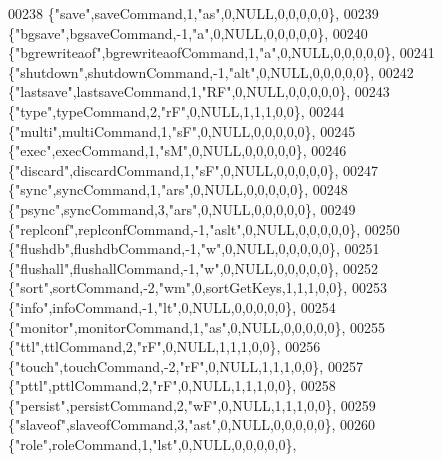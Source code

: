\begin{DoxyCode}
00238     \{\textcolor{stringliteral}{"save"},saveCommand,1,\textcolor{stringliteral}{"as"},0,NULL,0,0,0,0,0\},
00239     \{\textcolor{stringliteral}{"bgsave"},bgsaveCommand,-1,\textcolor{stringliteral}{"a"},0,NULL,0,0,0,0,0\},
00240     \{\textcolor{stringliteral}{"bgrewriteaof"},bgrewriteaofCommand,1,\textcolor{stringliteral}{"a"},0,NULL,0,0,0,0,0\},
00241     \{\textcolor{stringliteral}{"shutdown"},shutdownCommand,-1,\textcolor{stringliteral}{"alt"},0,NULL,0,0,0,0,0\},
00242     \{\textcolor{stringliteral}{"lastsave"},lastsaveCommand,1,\textcolor{stringliteral}{"RF"},0,NULL,0,0,0,0,0\},
00243     \{\textcolor{stringliteral}{"type"},typeCommand,2,\textcolor{stringliteral}{"rF"},0,NULL,1,1,1,0,0\},
00244     \{\textcolor{stringliteral}{"multi"},multiCommand,1,\textcolor{stringliteral}{"sF"},0,NULL,0,0,0,0,0\},
00245     \{\textcolor{stringliteral}{"exec"},execCommand,1,\textcolor{stringliteral}{"sM"},0,NULL,0,0,0,0,0\},
00246     \{\textcolor{stringliteral}{"discard"},discardCommand,1,\textcolor{stringliteral}{"sF"},0,NULL,0,0,0,0,0\},
00247     \{\textcolor{stringliteral}{"sync"},syncCommand,1,\textcolor{stringliteral}{"ars"},0,NULL,0,0,0,0,0\},
00248     \{\textcolor{stringliteral}{"psync"},syncCommand,3,\textcolor{stringliteral}{"ars"},0,NULL,0,0,0,0,0\},
00249     \{\textcolor{stringliteral}{"replconf"},replconfCommand,-1,\textcolor{stringliteral}{"aslt"},0,NULL,0,0,0,0,0\},
00250     \{\textcolor{stringliteral}{"flushdb"},flushdbCommand,-1,\textcolor{stringliteral}{"w"},0,NULL,0,0,0,0,0\},
00251     \{\textcolor{stringliteral}{"flushall"},flushallCommand,-1,\textcolor{stringliteral}{"w"},0,NULL,0,0,0,0,0\},
00252     \{\textcolor{stringliteral}{"sort"},sortCommand,-2,\textcolor{stringliteral}{"wm"},0,sortGetKeys,1,1,1,0,0\},
00253     \{\textcolor{stringliteral}{"info"},infoCommand,-1,\textcolor{stringliteral}{"lt"},0,NULL,0,0,0,0,0\},
00254     \{\textcolor{stringliteral}{"monitor"},monitorCommand,1,\textcolor{stringliteral}{"as"},0,NULL,0,0,0,0,0\},
00255     \{\textcolor{stringliteral}{"ttl"},ttlCommand,2,\textcolor{stringliteral}{"rF"},0,NULL,1,1,1,0,0\},
00256     \{\textcolor{stringliteral}{"touch"},touchCommand,-2,\textcolor{stringliteral}{"rF"},0,NULL,1,1,1,0,0\},
00257     \{\textcolor{stringliteral}{"pttl"},pttlCommand,2,\textcolor{stringliteral}{"rF"},0,NULL,1,1,1,0,0\},
00258     \{\textcolor{stringliteral}{"persist"},persistCommand,2,\textcolor{stringliteral}{"wF"},0,NULL,1,1,1,0,0\},
00259     \{\textcolor{stringliteral}{"slaveof"},slaveofCommand,3,\textcolor{stringliteral}{"ast"},0,NULL,0,0,0,0,0\},
00260     \{\textcolor{stringliteral}{"role"},roleCommand,1,\textcolor{stringliteral}{"lst"},0,NULL,0,0,0,0,0\},

\end{DoxyCode}
